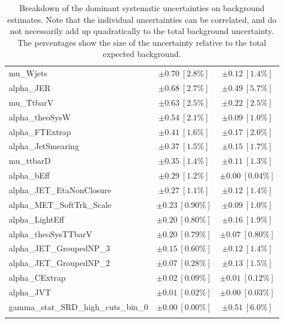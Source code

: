 \begin{table}
\begin{center}
\begin{tabular*}{\textwidth}{@{\extracolsep{\fill}}lcc}
mu\_Wjets         & $\pm 0.70\ [2.8\%] $          & $\pm 0.12\ [1.4\%] $       \\
alpha\_JER         & $\pm 0.68\ [2.7\%] $          & $\pm 0.49\ [5.7\%] $       \\
mu\_TtbarV         & $\pm 0.63\ [2.5\%] $          & $\pm 0.22\ [2.5\%] $       \\
alpha\_theoSysW         & $\pm 0.54\ [2.1\%] $          & $\pm 0.09\ [1.0\%] $       \\
alpha\_FTExtrap         & $\pm 0.41\ [1.6\%] $          & $\pm 0.17\ [2.0\%] $       \\
alpha\_JetSmearing         & $\pm 0.37\ [1.5\%] $          & $\pm 0.15\ [1.7\%] $       \\
mu\_ttbarD         & $\pm 0.35\ [1.4\%] $          & $\pm 0.11\ [1.3\%] $       \\
alpha\_bEff         & $\pm 0.29\ [1.2\%] $          & $\pm 0.00\ [0.04\%] $       \\
alpha\_JET\_EtaNonClosure         & $\pm 0.27\ [1.1\%] $          & $\pm 0.12\ [1.4\%] $       \\
alpha\_MET\_SoftTrk\_Scale         & $\pm 0.23\ [0.90\%] $          & $\pm 0.09\ [1.0\%] $       \\
alpha\_LightEff         & $\pm 0.20\ [0.80\%] $          & $\pm 0.16\ [1.9\%] $       \\
alpha\_theoSysTTbarV         & $\pm 0.20\ [0.79\%] $          & $\pm 0.07\ [0.80\%] $       \\
alpha\_JET\_GroupedNP\_3         & $\pm 0.15\ [0.60\%] $          & $\pm 0.12\ [1.4\%] $       \\
alpha\_JET\_GroupedNP\_2         & $\pm 0.07\ [0.28\%] $          & $\pm 0.13\ [1.5\%] $       \\
alpha\_CExtrap         & $\pm 0.02\ [0.09\%] $          & $\pm 0.01\ [0.12\%] $       \\
alpha\_JVT         & $\pm 0.01\ [0.02\%] $          & $\pm 0.00\ [0.03\%] $       \\
gamma\_stat\_SRD\_high\_cuts\_bin\_0         & $\pm 0.00\ [0.00\%] $          & $\pm 0.51\ [6.0\%] $       \\
\noalign{\smallskip}\hline\noalign{\smallskip}
\end{tabular*}
\end{center}
\caption[Breakdown of uncertainty on background estimates]{
Breakdown of the dominant systematic uncertainties on background estimates.
Note that the individual uncertainties can be correlated, and do not necessarily add up quadratically to 
the total background uncertainty. The percentages show the size of the uncertainty relative to the total expected background.
\label{table.results.bkgestimate.uncertainties.SRD_low_SRD_high}}
\end{table}
%